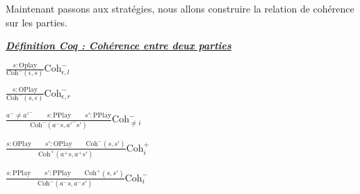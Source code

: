 \documentclass[a4paper,12ptCOUCOU
]{article}
\newlength{\mydepth}
\newlength{\myheight}
\newenvironment{answer}[1]
{\vspace{0.5cm}\begin{minipage}{\linewidth}\textbf{\textit{\underline{#1}}}\par\begin{lrbox}{\mybox}\quad\begin{minipage}{\linewidth}\color{black}\setlength{\parskip}{10pt}}
{\end{minipage}\end{lrbox}
\settodepth{\mydepth}{\usebox{\mybox}}
\settoheight{\myheight}{\usebox{\mybox}}
\addtolength{\myheight}{\mydepth}
\noindent\makebox[0pt]{
  \color{gray}\hspace{-0pt}\rule[-\mydepth]{1pt}{\myheight}}
\usebox{\mybox}
\end{minipage}
  }
\begin{document}
Maintenant passons aux stratégies, nous allons construire la relation de
cohérence sur les parties.

\begin{answer}{Définition Coq : Cohérence entre deux parties}

$\frac{s:\text{Oplay}}{\text{Coh}^-(\epsilon,s)} \text{Coh}^-_{\epsilon,l}$

$\frac{s:\text{OPlay}}{\text{Coh}^-(s,\epsilon)} \text{Coh}^-_{\epsilon,r}$

$\frac{a^- \neq a'^- \qquad s:\text{PPlay} \qquad s':\text{PPlay}}
{\text{Coh}^-(a^-s, a'^- s')} \text{Coh}^-_{\neq i}$

$\frac{s : \text{OPlay} \qquad s':\text{OPlay} \qquad \text{Coh}^-(s,s')}
{\text{Coh}^+(a^+s, a^+s')} \text{Coh}^+_i$

$\frac{s : \text{PPlay} \qquad s':\text{PPlay} \qquad \text{Coh}^+(s,s')}
{\text{Coh}^-(a^-s, a^-s')} \text{Coh}^-_i$

\end{answer}
\end{document}

